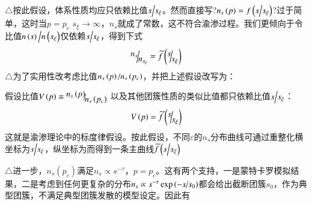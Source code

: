 \documentclass{article} %
\begin{document}
\noindent $\mathrm{\triangle}$按此假设，体系性质均应只依赖比值${s\mathord{\left/ {\vphantom {s s_{\xi } }} \right. \kern-\nulldelimiterspace} s_{\xi } } $。然而直接写?$n_{s} \left(p\right)=f\left({s\mathord{\left/ {\vphantom {s s_{\xi } }} \right. \kern-\nulldelimiterspace} s_{\xi } } \right)$?过于简单，这时当$p=p_{c} $ $s_{\xi } \to \infty $，$n_{s} $就成了常数，这不符合渝渗过程。我们更倾向于令比值${n\left(s\right)\mathord{\left/ {\vphantom {n\left(s\right) n\left(s_{\xi } \right)}} \right. \kern-\nulldelimiterspace} n\left(s_{\xi } \right)} $仅依赖${s\mathord{\left/ {\vphantom {s s_{\xi } }} \right. \kern-\nulldelimiterspace} s_{\xi } } $，得到下式
\[{\raise0.7ex\hbox{$ n_{s}  $}\!\mathord{\left/ {\vphantom {n_{s}  n_{s_{\xi } } }} \right. \kern-\nulldelimiterspace}\!\lower0.7ex\hbox{$ n_{s_{\xi } }  $}} =\widetilde{f}\left({\raise0.7ex\hbox{$ s $}\!\mathord{\left/ {\vphantom {s s_{\xi } }} \right. \kern-\nulldelimiterspace}\!\lower0.7ex\hbox{$ s_{\xi }  $}} \right)\] 
$\mathrm{\triangle}$为了实用性改考虑比值${n_{s} \left(p\right)\mathord{\left/ {\vphantom {n_{s} \left(p\right) n_{s} \left(p_{c} \right)}} \right. \kern-\nulldelimiterspace} n_{s} \left(p_{c} \right)} $，并把上述假设改写为：

\noindent 假设比值$V\left(p\right)\equiv {\raise0.7ex\hbox{$ n_{s} \left(p\right) $}\!\mathord{\left/ {\vphantom {n_{s} \left(p\right) n_{s} \left(p_{c} \right)}} \right. \kern-\nulldelimiterspace}\!\lower0.7ex\hbox{$ n_{s} \left(p_{c} \right) $}} $ 以及其他团簇性质的类似比值都只依赖比值${s\mathord{\left/ {\vphantom {s s_{\xi } }} \right. \kern-\nulldelimiterspace} s_{\xi } } $：
\[V\left(p\right)=\widetilde{f}\left({\raise0.7ex\hbox{$ s $}\!\mathord{\left/ {\vphantom {s s_{\xi } }} \right. \kern-\nulldelimiterspace}\!\lower0.7ex\hbox{$ s_{\xi }  $}} \right)\] 
这就是渝渗理论中的标度律假设。按此假设，不同$\varepsilon $的$n_{s} $分布曲线可通过重整化横坐标为${s\mathord{\left/ {\vphantom {s s_{\xi } }} \right. \kern-\nulldelimiterspace} s_{\xi } } $，纵坐标为而得到一条主曲线$\widetilde{f}\left({s\mathord{\left/ {\vphantom {s s_{\xi } }} \right. \kern-\nulldelimiterspace} s_{\xi } } \right)$

\noindent $\mathrm{\triangle}$进一步，$n_{s} \left(p_{c} \right)$满足$n_{s} \propto s^{-\tau } $，$p=p_{c} $。这有两个支持，一是蒙特卡罗模拟结果，二是考虑到任何更复杂的分布$n_{s} \propto s^{-\tau } \exp \left(-{s\mathord{\left/ {\vphantom {s s_{0} }} \right. \kern-\nulldelimiterspace} s_{0} } \right)$都会给出截断团簇$s_{0} $，作为典型团簇，不满足典型团簇发散的模型设定。因此有
\end{document}
